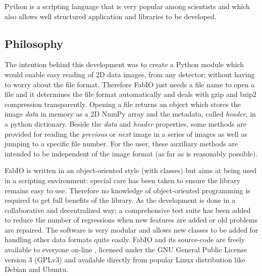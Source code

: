\documentclass[preprint ]{iucr}
\begin{document}
Python \cite{python} is a scripting language that is very popular among scientists
and which also allows well structured application and libraries to be developed.

\subsection{Philosophy}

The intention behind this development was to create a Python module which would
enable easy reading of 2D data images, from any detector; without having to
worry about the file format.
Therefore FabIO just needs a file name to open a file and it determines the
file format automatically and deals with gzip \cite{gzip} and bzip2
\cite{bzip2} compression transparently.
Opening a file returns an object which stores the image
{\em data} in memory as a 2D NumPy array \cite{numpy} and the metadata,
called {\em header}, in a python dictionary. Beside the
{\em data} and {\em header} properties, some methods are provided for reading
the {\em previous} or {\em next} image in a series of images as well as jumping
to a specific file number.
For the user, these auxiliary methods are intended to be independent of
the image format (as far as is reasonably possible).

FabIO is written in an object-oriented style (with classes) but aims at being
used in a scripting environment: special care has been taken to ensure the 
library remains easy to use. 
Therefore no knowledge of object-oriented programming is required to get 
full benefits of the library. 
As the development is done in a collaborative and decentralized way; a
comprehensive test suite has been added to reduce the number of regressions
when new features are added or old problems are repaired. 
The software is very modular and allows new classes to be added for handling 
other data formats quite easily.
FabIO and its source-code are freely available to everyone on-line \cite{fabio}, 
licensed under the GNU General Public License version 3 (GPLv3) and available
directly from popular Linux distribution like Debian and Ubuntu.
\end{document}
